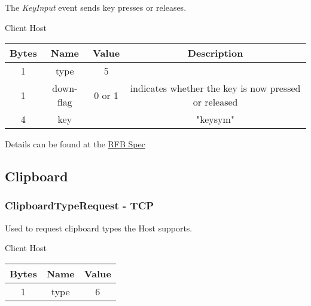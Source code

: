 \documentclass{article}
\begin{document}
    The \emph{KeyInput} event sends key presses or releases.

    \begin{center}
        Client \textrightarrow Host\\
        \begin{tabular}{|c|c|c|c|}
            \hline
            \textbf{Bytes} & \textbf{Name} & \textbf{Value} & \textbf{Description}                                 \\
            \hline
            1              & type          & 5              &                                                      \\
            \hline
            1              & down-flag     & 0 or 1         & indicates whether the key is now pressed or released \\
            \hline
            4              & key           &                & "keysym"                                             \\
            \hline
        \end{tabular}
    \end{center}

    Details can be found at the \href{https://github.com/rfbproto/rfbproto/blob/master/rfbproto.rst#keyevent}{RFB Spec}

    \subsection{Clipboard} %

    \subsubsection{ClipboardTypeRequest - TCP}

    Used to request clipboard types the Host supports.

    \begin{center}
        Client \textrightarrow Host\\
        \begin{tabular}{|c|c|c|}
            \hline
            \textbf{Bytes} & \textbf{Name} & \textbf{Value} \\
            \hline
            1              & type          & 6              \\
            \hline
        \end{tabular}
    \end{center}
\end{document}
